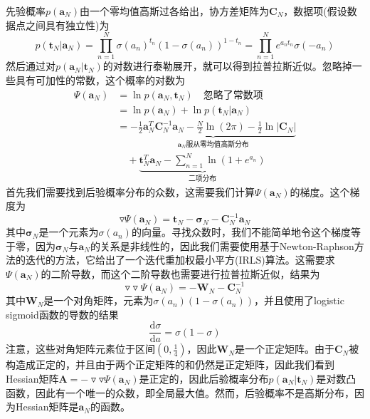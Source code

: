 先验概率$p(\boldsymbol{a}_N)$由一个零均值高斯过各给出，协方差矩阵为$\boldsymbol{C}_N$，数据项(假设数据点之间具有独立性)为
\begin{equation}
	p(\boldsymbol{t}_N|\boldsymbol{a}_N)=\prod_{n=1}^{N}\sigma(a_n)^{t_n}(1-\sigma(a_n))^{1-t_n}=\prod_{n=1}^{N}e^{a_nt_n}\sigma(-a_n)
\end{equation}
然后通过对$p(\boldsymbol{a}_N|\boldsymbol{t}_N)$的对数进行泰勒展开，就可以得到拉普拉斯近似。忽略掉一些具有可加性的常数，这个概率的对数为
\begin{equation}
\begin{aligned}
	\Psi(\boldsymbol{a}_N)&=\ln p(\boldsymbol{a}_N,\boldsymbol{t}_N)\quad \text{忽略了常数项}\\
	&=\ln p(\boldsymbol{a}_N)+\ln p(\boldsymbol{t}_N|\boldsymbol{a}_N)\\
	&=\underbrace{-\frac{1}{2}\boldsymbol{a}_N^T\boldsymbol{C}_N^{-1}\boldsymbol{a}_N-\frac{N}{2}\ln (2\pi)-\frac{1}{2}\ln |\boldsymbol{C}_N|}_{\text{$\boldsymbol{a}_N$服从零均值高斯分布}}\\
	&\quad  +\underbrace{\boldsymbol{t}_N^T\boldsymbol{a}_N-\sum_{n=1}^{N}\ln (1+e^{a_n})}_{\text{二项分布}}
\end{aligned}
\end{equation}
首先我们需要找到后验概率分布的众数，这需要我们计算$\Psi (\boldsymbol{a}_N)$的梯度。这个梯度为
\begin{equation}
	\triangledown \Psi(\boldsymbol{a}_N)=\boldsymbol{t}_N-\boldsymbol{\sigma}_N-\boldsymbol{C}_N^{-1}\boldsymbol{a}_N
\end{equation}
其中$\boldsymbol{\sigma}_N$是一个元素为$\sigma(a_n)$的向量。寻找众数时，我们不能简单地令这个梯度等于零，因为$\boldsymbol{\sigma}_N$与$\boldsymbol{a}_N$的关系是非线性的，因此我们需要使用基于Newton-Raphson方法的迭代的方法，它给出了一个迭代重加权最小平方(IRLS)算法。这需要求$\Psi(\boldsymbol{a}_N)$的二阶导数，而这个二阶导数也需要进行拉普拉斯近似，结果为
\begin{equation}
	\triangledown\triangledown \Psi(\boldsymbol{a}_N)=-\boldsymbol{W}_N-\boldsymbol{C}_N^{-1}
\end{equation}
其中$\boldsymbol{W}_N$是一个对角矩阵，元素为$\sigma(a_n)(1-\sigma(a_n))$，并且使用了logistic sigmoid函数的导数的结果
\begin{equation}
	\frac{\mathrm{d}\sigma}{\mathrm{d}a}=\sigma(1-\sigma)
\end{equation}
注意，这些对角矩阵元素位于区间$(0,\frac{1}{4})$，因此$\boldsymbol{W}_N$是一个正定矩阵。由于$\boldsymbol{C}_N$被构造成正定的，并且由于两个正定矩阵的和仍然是正定矩阵，因此我们看到Hessian矩阵$\boldsymbol{A}=-\triangledown\triangledown \Psi(\boldsymbol{a}_N)$是正定的，因此后验概率分布$p(\boldsymbol{a}_N|\boldsymbol{t}_N)$是对数凸函数，因此有一个唯一的众数，即全局最大值。然而，后验概率不是高斯分布，因为Hessian矩阵是$\boldsymbol{a}_N$的函数。

